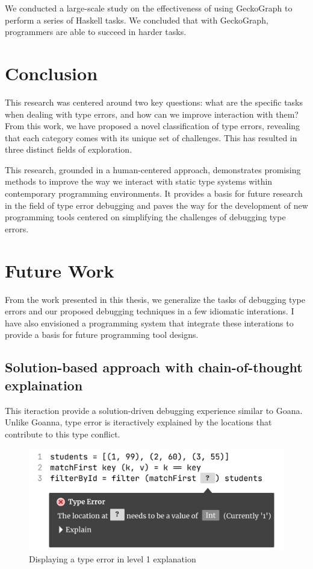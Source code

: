 We conducted a large-scale study on the effectiveness of using GeckoGraph to perform a series of Haskell tasks. We concluded that with GeckoGraph, programmers are able to succeed in harder tasks.

\section{Conclusion}

This research was centered around two key questions: what are the specific tasks when dealing with type errors, and how can we improve interaction with them? From this work, we have proposed a novel classification of type errors, revealing that each category comes with its unique set of challenges. This has resulted in three distinct fields of exploration. 

This research, grounded in a human-centered approach, demonstrates promising methods to improve the way we interact with static type systems within contemporary programming environments. It provides a basis for future research in the field of type error debugging and paves the way for the development of new programming tools centered on simplifying the challenges of debugging type errors. 

\section{Future Work}

From the work presented in this thesis, we generalize
the tasks of debugging type errors and our proposed debugging techniques in a few idiomatic interations.  I have also envisioned a programming system that integrate these interations to provide a basis for future programming tool designs.



\subsection{Solution-based approach with chain-of-thought explaination}

This iteraction provide a  solution-driven debugging experience similar to Goana. Unlike Goanna, type error is iteractively explained by the locations that contribute to this type conflict.

\begin{figure}[hbt]
    \includegraphics[width=\linewidth]{Debugging-1}
    \caption{
        Displaying a type error in level 1 explanation
      }
  \end{figure}
  

